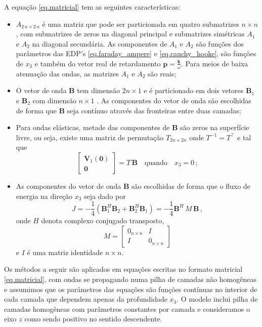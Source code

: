 A equação \ref{eq.matricial} tem as seguintes caracter\'isticas:
\begin{itemize}
\item $A_{2\,n\times2\,n}$ \'e uma matriz que pode ser particionada em quatro submatrizes $n\times n$, com submatrizes de zeros na diagonal principal e submatrizes sim\'etricas $A_1$ e $A_2$ na diagonal secund\'aria. As componentes de $A_1$ e $A_2$ s\~ao fun\c{c}\~oes dos par\^ametros das EDP's \ref{eq.faraday_ampere} e \ref{eq.cauchy_hooke}, s\~ao fun\c{c}\~oes de $x_3$ e tamb\'em do vetor real de retardamento $\mathbf{p}=\frac{\mathbf{k}}{\omega}$. Para meios de baixa atenua\c{c}\~ao das ondas, as matrizes $A_1$ e $A_2$ s\~ao reais; 
\item O vetor de onda $\mathbf{B}$ tem dimens\~ao $2n\times1$ e \'e particionado em dois vetores $\mathbf{B}_1$ e $\mathbf{B}_2$ com dimens\~ao $n\times1$ . As componentes do vetor de onda s\~ao escolhidas de forma que $\mathbf{B}$ seja cont\'inuo atrav\'es das fronteiras entre duas camadas;
\item  Para ondas el\'asticas, metade das componentes de $\mathbf{B}$ s\~ao zeros na superf\'icie livre, ou seja, existe uma matriz de permuta\c{c}\~ao $T_{2n\times2n}$ onde $T^{-1}=T^\top$ e tal que
\begin{equation*}
\begin{bmatrix}
\mathbf{V}_1(\mathbf{0})\\
\mathbf{0}
\end{bmatrix}
=T\,\mathbf{B}\quad\text{quando}\quad x_3 = 0\,;
\end{equation*}
\item As componentes do vetor de onda $\mathbf{B}$ s\~ao escolhidas de forma que o fluxo de energia na dire\c{c}\~ao $x_3$ seja dado por
\begin{equation*}
J=-\frac{1}{4}(\mathbf{B}_1^H\mathbf{B}_2+\mathbf{B}_2^H\mathbf{B}_1)=-\frac{1}{4}\mathbf{B}^H\,M\, \mathbf{B}\,,
\end{equation*}
onde $H$ denota complexo conjugado transposto,
\begin{equation*}
M=
\begin{bmatrix}
0_{n\times n}&I\\
I&0_{n\times n}
\end{bmatrix}
\end{equation*}
e $I$ \'e uma matriz identidade $n\times n$.
\end{itemize}

Os m\'etodos a seguir s\~ao aplicados em equa\c{c}\~oes escritas no formato matricial \ref{eq.matricial}, com ondas se propagando numa pilha de camadas n\~ao homog\^eneas e assumimos que os par\^ametros das equa\c{c}\~oes s\~ao fun\c{c}\~oes cont\'inuas no interior de cada camada que dependem apenas da profundidade $x_3$. O modelo inclui pilha de camadas homog\^eneas com par\^ametros constantes por camada e consideramos o eixo $z$ como sendo positivo no sentido descendente.   

